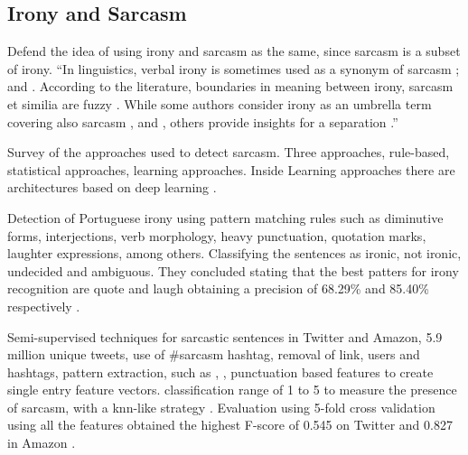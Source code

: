 \subsection{Irony and Sarcasm}
\label{subsec:irony_sarcasm}

Defend the idea of using irony and sarcasm as the same, since sarcasm is a subset of irony.
``In linguistics, verbal irony is sometimes used as a synonym of sarcasm \cite{giora2013negation}; \cite{giora2015defaultness} and \cite{giora2015default}. According to the literature, boundaries in meaning between irony, sarcasm et similia are fuzzy \cite{bosco2013developing}. While some authors consider irony as an umbrella term covering also sarcasm \cite{gibbs1991psychological}, \cite{wilson2006pragmatics} and \cite{kreuz1993empirical}, others provide insights for a separation \cite{filatova2012irony}.''


Survey of the approaches used to detect sarcasm. Three approaches, rule-based, statistical approaches, learning approaches. Inside Learning approaches there are architectures based on deep learning \cite{joshi2016automatic}.

Detection of Portuguese irony using pattern matching rules such as diminutive forms, interjections, verb morphology, heavy punctuation, quotation marks, laughter expressions, among others. Classifying the sentences as ironic, not ironic, undecided and ambiguous. They concluded stating that the best patters for irony recognition are quote and laugh obtaining a precision of 68.29\% and 85.40\% respectively \cite{carvalho2009clues}.

Semi-supervised techniques for sarcastic sentences in Twitter and Amazon, 5.9 million unique tweets, use of \#sarcasm hashtag, removal of link, users and hashtags, pattern extraction, such as , , punctuation based features to create single entry feature vectors. classification range of 1 to 5 to measure the presence of sarcasm, with a \acrfull{knn}-like strategy \cite{davidov2010enhanced}. Evaluation using 5-fold cross validation using all the features obtained the highest F-score of 0.545 on Twitter and 0.827 in Amazon \cite{davidov2010semi}.